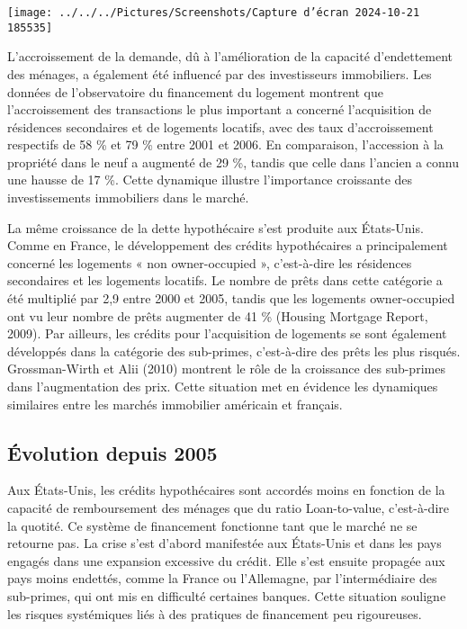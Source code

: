 \documentclass[a4paper, 12pt]{report}
\begin{document}
\begin{center}
	\texttt{[image: ../../../Pictures/Screenshots/Capture d'écran 2024-10-21 185535]}
\end{center}

L'accroissement de la demande, dû à l'amélioration de la capacité d'endettement des ménages, a également été influencé par des investisseurs immobiliers. Les données de l'observatoire du financement du logement montrent que l'accroissement des transactions le plus important a concerné l'acquisition de résidences secondaires et de logements locatifs, avec des taux d'accroissement respectifs de 58 \% et 79 \% entre 2001 et 2006. En comparaison, l'accession à la propriété dans le neuf a augmenté de 29 \%, tandis que celle dans l'ancien a connu une hausse de 17 \%. Cette dynamique illustre l'importance croissante des investissements immobiliers dans le marché.

La même croissance de la dette hypothécaire s'est produite aux États-Unis. Comme en France, le développement des crédits hypothécaires a principalement concerné les logements « non owner-occupied », c'est-à-dire les résidences secondaires et les logements locatifs. Le nombre de prêts dans cette catégorie a été multiplié par 2,9 entre 2000 et 2005, tandis que les logements owner-occupied ont vu leur nombre de prêts augmenter de 41 \% (Housing Mortgage Report, 2009). Par ailleurs, les crédits pour l'acquisition de logements se sont également développés dans la catégorie des sub-primes, c'est-à-dire des prêts les plus risqués. Grossman-Wirth et Alii (2010) montrent le rôle de la croissance des sub-primes dans l'augmentation des prix. Cette situation met en évidence les dynamiques similaires entre les marchés immobilier américain et français.

\subsection{Évolution depuis 2005}

Aux États-Unis, les crédits hypothécaires sont accordés moins en fonction de la capacité de remboursement des ménages que du ratio Loan-to-value, c'est-à-dire la quotité. Ce système de financement fonctionne tant que le marché ne se retourne pas. La crise s'est d'abord manifestée aux États-Unis et dans les pays engagés dans une expansion excessive du crédit. Elle s'est ensuite propagée aux pays moins endettés, comme la France ou l'Allemagne, par l'intermédiaire des sub-primes, qui ont mis en difficulté certaines banques. Cette situation souligne les risques systémiques liés à des pratiques de financement peu rigoureuses.
\end{document}
